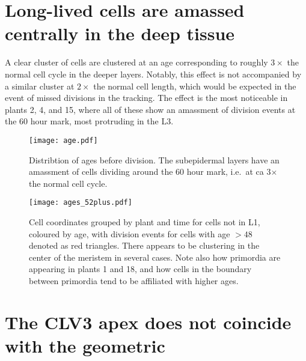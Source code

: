 \section{Long-lived cells are amassed centrally in the deep tissue}
A clear cluster of cells are clustered at an age corresponding to roughly
$3\times$ the normal cell cycle in the deeper layers. Notably, this effect is
not accompanied by a similar cluster at $2\times$ the normal cell length, which
would be expected in the event of missed divisions in the tracking. The effect
is the most noticeable in plants 2, 4, and 15, where all of these show an
amassment of division events at the 60 hour mark, most protruding in the L3. 

\begin{figure}[H]
  \centering
  \texttt{[image: age.pdf]}
  \caption[Layer-wise age distribution]{Distribtion of ages before division. The subepidermal layers have an
    amassment of cells dividing around the 60 hour mark, i.e.\ at ca 3$\times$
    the normal cell cycle.}
  \label{fig:age}
\end{figure}

\begin{figure}[H]
  \centering
  \texttt{[image: ages\_52plus.pdf]}
  \caption[Clustering of high-longevity cells]{Cell coordinates grouped by plant and time for cells not in L1, coloured by age, with division events for cells with
    age $>48$ denoted as red triangles. There appears to be clustering in the
    center of the meristem in several cases. Note also how primordia are appearing in plants 1
    and 18, and how cells in the boundary between primordia tend to be
    affiliated with higher ages.}
  \label{fig:ages}
\end{figure}

\section{The CLV3 apex does not coincide with the geometric}

